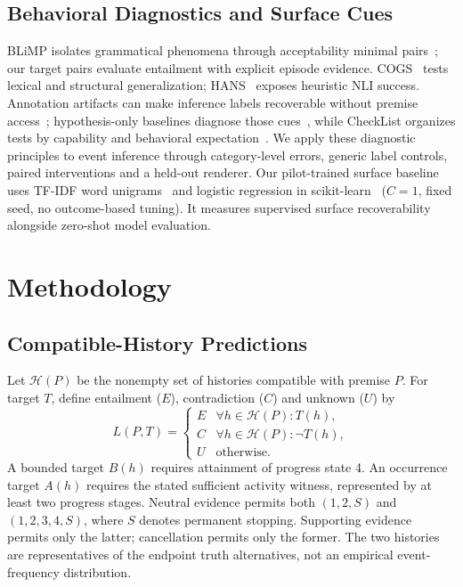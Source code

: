 \documentclass[sigconf,anonymous,review]{acmart}
\begin{document}
\subsection{Behavioral Diagnostics and Surface Cues}
BLiMP isolates grammatical phenomena through acceptability minimal pairs~\cite{blimp2020}; our target pairs evaluate entailment with explicit episode evidence. COGS~\cite{cogs2020} tests lexical and structural generalization; HANS~\cite{hans2019} exposes heuristic NLI success. Annotation artifacts can make inference labels recoverable without premise access~\cite{gururangan2018}; hypothesis-only baselines diagnose those cues~\cite{poliak2018}, while CheckList organizes tests by capability and behavioral expectation~\cite{checklist2020}. We apply these diagnostic principles to event inference through category-level errors, generic label controls, paired interventions and a held-out renderer. Our pilot-trained surface baseline uses TF-IDF word unigrams~\cite{salton1988} and logistic regression in scikit-learn~\cite{sklearn2011} ($C=1$, fixed seed, no outcome-based tuning). It measures supervised surface recoverability alongside zero-shot model evaluation.

\section{Methodology}
\subsection{Compatible-History Predictions}
Let $\mathcal{H}(P)$ be the nonempty set of histories compatible with premise $P$. For target $T$, define entailment ($E$), contradiction ($C$) and unknown ($U$) by
\begin{equation}
 L(P,T)=\begin{cases}
 E & \forall h\in\mathcal{H}(P):T(h),\\
 C & \forall h\in\mathcal{H}(P):\neg T(h),\\
 U & \text{otherwise}.
 \end{cases}
\end{equation}
A bounded target $B(h)$ requires attainment of progress state 4. An occurrence target $A(h)$ requires the stated sufficient activity witness, represented by at least two progress stages. Neutral evidence permits both $(1,2,S)$ and $(1,2,3,4,S)$, where $S$ denotes permanent stopping. Supporting evidence permits only the latter; cancellation permits only the former. The two histories are representatives of the endpoint truth alternatives, not an empirical event-frequency distribution.
\end{document}
